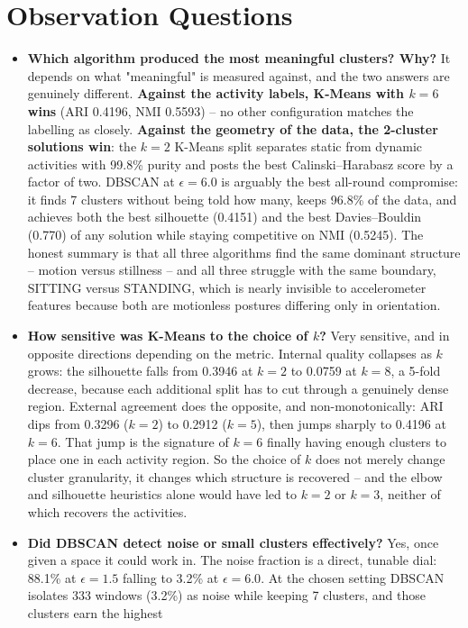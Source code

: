 \documentclass[12pt,a4paper]{article}
\DeclareRobustCommand{\_}{\textunderscore\allowbreak}
\begin{document}
\section{Observation Questions}
\begin{itemize}
\item \textbf{Which algorithm produced the most meaningful clusters? Why?}
It depends on what "meaningful" is measured
against, and the two answers are genuinely different.
\textbf{Against the activity labels, K-Means with $k = 6$ wins} (ARI 0.4196,
NMI 0.5593) -- no other configuration matches the labelling as closely.
\textbf{Against the geometry of the data, the 2-cluster solutions win}: the
$k = 2$ K-Means split separates static from dynamic activities with 99.8\%
purity and posts the best Calinski--Harabasz score by a factor of two.
DBSCAN at $\epsilon = 6.0$ is arguably the best all-round compromise: it finds
7 clusters without being told how many, keeps 96.8\% of the data, and achieves
both the best silhouette (0.4151) and the best Davies--Bouldin (0.770) of any
solution while staying competitive on NMI (0.5245). The honest summary is that
all three algorithms find the same dominant structure -- motion versus
stillness -- and all three struggle with the same boundary, SITTING versus
STANDING, which is nearly invisible to accelerometer features because both are
motionless postures differing only in orientation.
\item \textbf{How sensitive was K-Means to the choice of $k$?} Very sensitive, and in opposite directions
depending on the metric. Internal quality collapses as $k$ grows: the
silhouette falls from 0.3946 at $k = 2$ to 0.0759 at $k = 8$, a 5-fold
decrease, because each additional split has to cut through a genuinely dense
region. External agreement does the opposite, and non-monotonically: ARI dips
from 0.3296 ($k=2$) to 0.2912 ($k=5$), then jumps sharply to 0.4196 at
$k = 6$. That jump is the signature of $k = 6$ finally having enough clusters
to place one in each activity region. So the choice of $k$ does not merely
change cluster granularity, it changes which structure is recovered -- and the
elbow and silhouette heuristics alone would have led to $k = 2$ or $k = 3$,
neither of which recovers the activities.
\item \textbf{Did DBSCAN detect noise or small clusters effectively?} Yes, once given a space it could work in. The
noise fraction is a direct, tunable dial: 88.1\% at $\epsilon = 1.5$ falling to
3.2\% at $\epsilon = 6.0$. At the chosen setting DBSCAN isolates 333 windows
(3.2\%) as noise while keeping 7 clusters, and those clusters earn the highest

\end{itemize}
\end{document}
